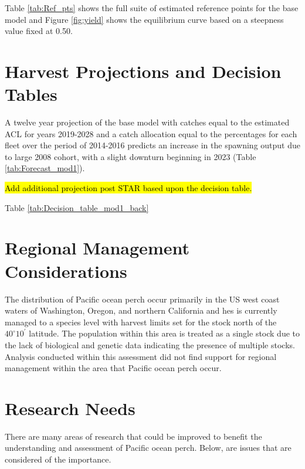 \documentclass[12pt,]{article}
\begin{document}
Table \ref{tab:Ref_pts} shows the full suite of estimated reference
points for the base model and Figure \ref{fig:yield} shows the
equilibrium curve based on a steepness value fixed at 0.50.

\section{Harvest Projections and Decision
Tables}\label{harvest-projections-and-decision-tables}

A twelve year projection of the base model with catches equal to the
estimated ACL for years 2019-2028 and a catch allocation equal to the
percentages for each fleet over the period of 2014-2016 predicts an
increase in the spawning output due to large 2008 cohort, with a slight
downturn beginning in 2023 (Table \ref{tab:Forecast_mod1}).

\hl{Add additional projection post STAR based upon the decision table.}

Table \ref{tab:Decision_table_mod1_back}

\section{Regional Management
Considerations}\label{regional-management-considerations}

The distribution of Pacific ocean perch occur primarily in the US west
coast waters of Washington, Oregon, and northern California and hes is
currently managed to a species level with harvest limits set for the
stock north of the \(40^\circ 10^\prime\) latitude. The population
within this area is treated as a single stock due to the lack of
biological and genetic data indicating the presence of multiple stocks.
Analysis conducted within this assessment did not find support for
regional management within the area that Pacific ocean perch occur.

\section{Research Needs}\label{research-needs}

There are many areas of research that could be improved to benefit the
understanding and assessment of Pacific ocean perch. Below, are issues
that are considered of the importance.
\end{document}
